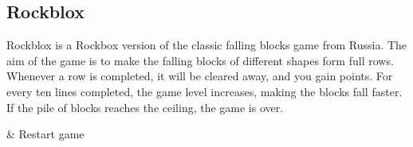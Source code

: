 \subsection{Rockblox}
Rockblox is a Rockbox version of the classic falling blocks game from Russia. 
The aim of the game is to make the falling blocks of different shapes 
form full rows. Whenever a row is completed,  it will be cleared away, and you
gain points. For every ten lines completed, the game level increases, making
the blocks fall faster. If the pile of blocks reaches the ceiling, the game is over.

\begin{btnmap}
        & Restart game\\


\end{btnmap}
